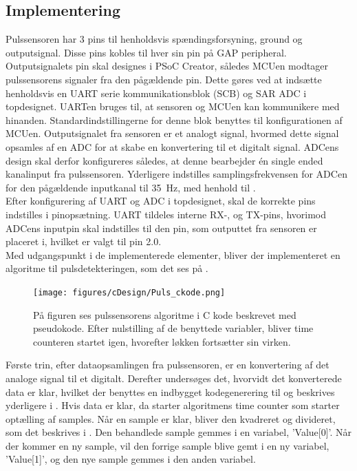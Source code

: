 \subsection{Implementering} \label{puls_impl}
Pulssensoren har 3 pins til henholdsvis spændingsforsyning, ground og outputsignal. Disse pins kobles til hver sin pin på GAP peripheral. Outputsignalets pin skal designes i PSoC Creator, således MCUen modtager pulssensorens signaler fra den pågældende pin. Dette gøres ved at indsætte henholdsvis en UART serie kommunikationsblok (SCB) og SAR ADC i topdesignet. UARTen bruges til, at sensoren og MCUen kan kommunikere med hinanden. Standardindstillingerne for denne blok benyttes til konfigurationen af MCUen. \newline
Outputsignalet fra sensoren er et analogt signal, hvormed dette signal opsamles af en ADC for at skabe en konvertering til et digitalt signal. ADCens design skal derfor konfigureres således, at denne bearbejder én single ended kanalinput fra pulssensoren. Yderligere indstilles samplingsfrekvensen for ADCen for den pågældende inputkanal til 35~Hz, med henhold til . \\
Efter konfigurering af UART og ADC i topdesignet, skal de korrekte pins indstilles i pinopsætning. UART tildeles interne RX-, og TX-pins, hvorimod ADCens inputpin skal indstilles til den pin, som outputtet fra sensoren er placeret i, hvilket er valgt til pin 2.0. \\
Med udgangspunkt i de implementerede elementer, bliver der implementeret en algoritme til pulsdetekteringen, som det ses på .
\begin{figure}[H]
	\centering
	\texttt{[image: figures/cDesign/Puls\_ckode.png]}
	\caption{På figuren ses pulssensorens algoritme i C kode beskrevet med pseudokode. Efter nulstilling af de benyttede variabler, bliver time counteren startet igen, hvorefter løkken fortsætter sin virken.}
	\label{fig:puls_pseudo_c}
\end{figure} \vspace{-0.5cm}
Første trin, efter dataopsamlingen fra pulssensoren, er en konvertering af det analoge signal til et digitalt. Derefter undersøges det, hvorvidt det konverterede data er klar, hvilket der benyttes en indbygget kodegenerering til og beskrives yderligere i . Hvis data er klar, da starter algoritmens time counter som starter optælling af samples. Når en sample er klar, bliver den kvadreret og divideret, som det beskrives i . Den behandlede sample gemmes i en variabel, 'Value[0]'. Når der kommer en ny sample, vil den forrige sample blive gemt i en ny variabel, 'Value[1]', og den nye sample gemmes i den anden variabel. \\
